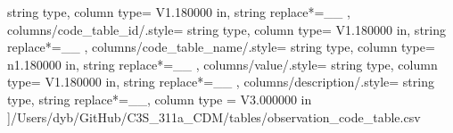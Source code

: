 \begin{landscape}
{            string type, 
            column type= V{1.180000 in}, 
            string replace*={_}{\_}
        },
    columns/code_table_id/.style={
            string type, 
            column type= V{1.180000 in}, 
            string replace*={_}{\_}
        },
    columns/code_table_name/.style={
            string type, 
            column type= n{1.180000 in}, 
            string replace*={_}{\_}
        },
    columns/value/.style={
            string type, 
            column type= V{1.180000 in}, 
            string replace*={_}{\_}
        },
    columns/description/.style={
            string type, 
            string replace*={_}{\_},
            column type = V{3.000000 in}
        }
    ]{/Users/dyb/GitHub/C3S_311a_CDM/tables/observation_code_table.csv}
\end{landscape}
